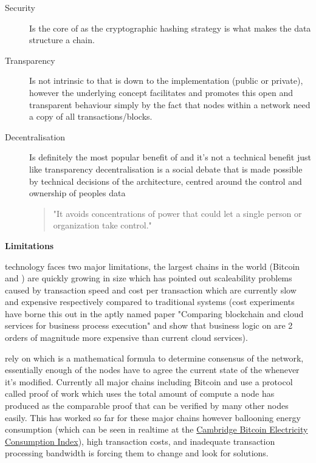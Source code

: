 \begin{description}
	\item[Security] Is the core of  as the cryptographic hashing strategy is what makes the data structure a chain.
	\item[Transparency] Is not intrinsic to  that is down to the implementation (public or private), however the underlying concept facilitates and promotes this open and transparent behaviour simply by the fact that nodes within a  network need a copy of all transactions/blocks.
	\item[Decentralisation] Is definitely the most popular benefit of  and it's not a technical benefit just like transparency decentralisation is a social debate that is made possible by technical decisions of the  architecture, centred around the control and ownership of peoples data \begin{quote}"It avoids concentrations of power that could let a single person or organization take control."\cite{bohme2015bitcoin}\end{quote} 
\end{description}

{\noindent\regular\textbf{Limitations}\vspace{2mm}}

\noindent{} technology faces two major limitations, the largest chains in the world (Bitcoin and ) are quickly growing in size which has pointed out scaleability problems caused by transaction speed and cost per transaction which are currently slow and expensive respectively compared to traditional systems (cost experiments have borne this out in the aptly named paper "Comparing blockchain and cloud services for business process execution"\cite{rimba2017comparing} and show that business logic on  are 2 orders of magnitude more expensive than current cloud services).

 rely on  which is a mathematical formula to determine consensus of the network, essentially enough of the nodes have to agree the current state of the  whenever it's modified. Currently all major chains including Bitcoin and  use a protocol called proof of work\cite{PoW} which uses the total amount of compute a node has produced as the comparable proof that can be verified by many other nodes easily. This has worked so far for these major chains however ballooning energy consumption (which can be seen in realtime at the \href{https://ccaf.io/cbeci/index}{Cambridge Bitcoin Electricity Consumption Index}), high transaction costs, and inadequate transaction processing bandwidth is forcing them to change and look for solutions.

